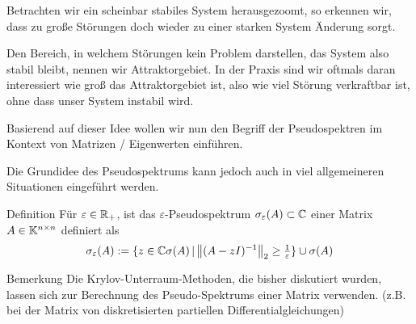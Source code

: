 Betrachten wir ein scheinbar stabiles System herausgezoomt, so erkennen wir, dass zu große Störungen doch wieder zu 
einer starken System Änderung sorgt.

\begin{center}
  
\end{center}

Den Bereich, in welchem Störungen kein Problem darstellen, das System also stabil bleibt, nennen wir Attraktorgebiet.
In der Praxis sind wir oftmals daran interessiert wie groß das Attraktorgebiet ist, also wie viel Störung verkraftbar 
ist, ohne dass unser System instabil wird.

Basierend auf dieser Idee wollen wir nun den Begriff der Pseudospektren im Kontext von Matrizen / Eigenwerten einführen.

Die Grundidee des Pseudospektrums kann jedoch auch in viel allgemeineren Situationen eingeführt werden. 




\begin{colbox}{Definition}
  Für $\varepsilon\in\mathbb R_+$, ist das $\varepsilon$-Pseudospektrum $\sigma_\varepsilon(A)\subset\mathbb C  $ 
  einer Matrix $A\in\mathbb K^{n\times n}$ definiert als 
  \begin{align*}
    \sigma_\varepsilon(A) := \{z\in\C  \sigma(A)\,|\, \vertn{2}{(A-zI)^{-1}}_2\geq \tfrac{1}{\varepsilon}\} \cup \sigma(A)
  \end{align*}
\end{colbox}

\begin{colbox}{Bemerkung}
  Die Krylov-Unterraum-Methoden, die bisher diskutiert wurden, lassen sich zur Berechnung des Pseudo-Spektrums einer 
  Matrix verwenden. (z.B. bei der Matrix von diskretisierten partiellen Differentialgleichungen)
\end{colbox}

